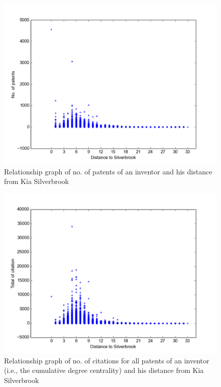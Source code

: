 \begin{figure}[t]
  \includegraphics[scale=0.425]{figure/distance_patents.pdf}
  \caption{Relationship graph of no. of patents of an inventor and his distance from Kia Silverbrook}
\label{fig:distance_patent}
\end{figure}

\begin{figure}[t]
  \includegraphics[scale=0.425]{figure/abc.pdf}
  \caption{ Relationship graph of no. of citations for all patents of an inventor (i.e., the cumulative degree centrality) and his distance from Kia Silverbrook}
\label{fig:distance_citation}
\end{figure}



